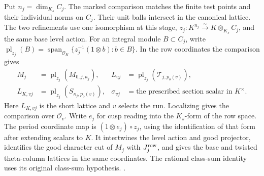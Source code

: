 Put \(n_j=\dim_{K_s} C_j\). The marked
comparison matches the finite test points and their individual norms
on \(C_j\). Their unit balls intersect in the canonical lattice. The
two refinements use one isomorphism at this stage,
\(z_j:K^{n_j}\xrightarrow{\sim}K\otimes_{K_s}C_j\), and the same
base level action. For an integral module \(B\subset C_j\), write
\(\operatorname{pl}_{z_j}(B)=\operatorname{span}_{\mathcal O_K}
\{z_j^{-1}(1\otimes b):b\in B\}\). In the row coordinates the
comparison gives
\[
 \begin{aligned}
 M_j &= \operatorname{pl}_{z_j}(M_{0,j,\kappa_j}), &
 L_{vj} &= \operatorname{pl}_{z_j}(\mathcal T_{j,p_o(v)}),\\
 L_{K,vj} &= \operatorname{pl}_{z_j}(S_{\kappa_j,p_o(v)}), &
 \sigma_{vj} &= \text{the prescribed section scalar in }K^\times.
 \end{aligned}
\]
Here \(L_{K,vj}\) is the short lattice and \(v\) selects the run.
Localizing gives the comparison over \(\mathcal O_v\). Write \(e_j\)
for cusp reading into the \(K_s\)-form of the row space. The period
coordinate map is \((1\otimes e_j)\circ z_j\), using the identification
of that form after extending scalars to \(K\). It intertwines the level
action and good projector, identifies the good character cut of \(M_j\)
with \(J_j^{\rm row}\), and gives the base and twisted theta-column
lattices in the same coordinates. The rational class-sum identity
uses its original class-sum hypothesis.
.

